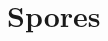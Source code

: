 \documentclass[runningheads]{llncs}
\begin{document}
\begin{sloppypar}




\vspace{1mm}
\section{Spores}
\label{sec:spores}




\end{sloppypar}
\end{document}
